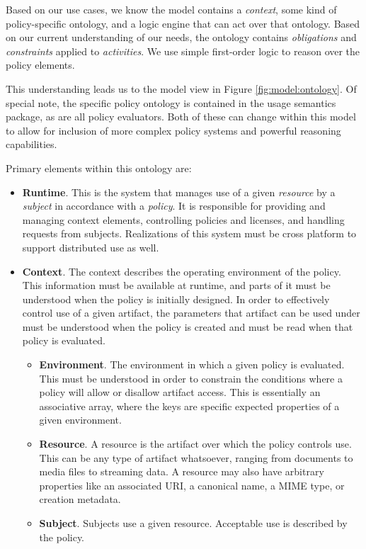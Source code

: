 Based on our use cases, we know the model contains a \emph{context}, some kind of policy-specific ontology, and a logic engine that can act over that ontology.  Based on our current understanding of our needs, the ontology contains \emph{obligations} and \emph{constraints} applied to \emph{activities}.  We use simple first-order logic to reason over the policy elements.

This understanding leads us to the model view in Figure \ref{fig:model:ontology}.  Of special note, the specific policy ontology is contained in the usage semantics package, as are all policy evaluators.  Both of these can change within this model to allow for inclusion of more complex policy systems and powerful reasoning capabilities.

Primary elements within this ontology are:
\begin{itemize}
\item \textbf{Runtime}.  This is the system that manages use of a given \emph{resource} by a \emph{subject} in accordance with a \emph{policy}.  It is responsible for providing and managing context elements, controlling policies and licenses, and handling requests from subjects.  Realizations of this system must be cross platform to support distributed use as well.
\item \textbf{Context}.  The context describes the operating environment of the policy.  This information must be available at runtime, and parts of it must be understood when the policy is initially designed.  In order to effectively control use of a given artifact, the parameters that artifact can be used under must be understood when the policy is created and must be read when that policy is evaluated.
\begin{itemize}
\item \textbf{Environment}.  The environment in which a given policy is evaluated.  This must be understood in order to constrain the conditions where a policy will allow or disallow artifact access.  This is essentially an associative array, where the keys are specific expected properties of a given environment.
\item \textbf{Resource}.  A resource is the artifact over which the policy controls use.  This can be any type of artifact whatsoever, ranging from documents to media files to streaming data.  A resource may also have arbitrary properties like an associated URI, a canonical name, a MIME type, or creation metadata.
\item \textbf{Subject}.  Subjects use a given resource.  Acceptable use is described by the policy.

\end{itemize}
\end{itemize}

